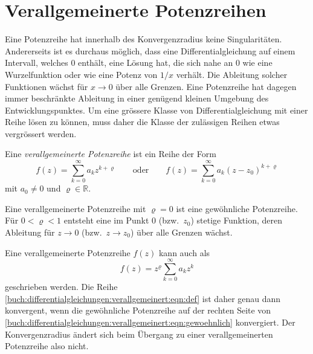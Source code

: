 %
%
%
\section{Verallgemeinerte Potenzreihen}
Eine Potenzreihe hat innerhalb des Konvergenzradius keine Singularitäten.
Andererseits ist es durchaus möglich, dass eine Differentialgleichung
auf einem Intervall, welches $0$ enthält, eine Lösung hat, die sich
nahe an $0$ wie eine Wurzelfunktion oder wie eine Potenz von $1/x$
verhält.
Die Ableitung solcher Funktionen wächst für $x\to 0$ über alle
Grenzen.
Eine Potenzreihe hat dagegen immer beschränkte Ableitung in einer 
genügend kleinen Umgebung des Entwicklungspunktes.
Um eine grössere Klasse von Differentialgleichung mit einer Reihe
lösen zu können, muss daher die Klasse der zulässigen Reihen etwas
vergrössert werden.

\begin{definition}
\label{buch:differentialgleichungen:verallgemeinert:def}
Eine \emph{verallgemeinerte Potenzreihe} ist ein Reihe der Form
%
\begin{equation}
f(z)
=
\sum_{k=0}^\infty
a_k z^{k+\varrho}
\qquad\text{oder}\qquad
f(z)
=
\sum_{k=0}^\infty
a_k (z-z_0)^{k+\varrho}
\label{buch:differentialgleichungen:verallgemeinert:eqn:def}
\end{equation}
mit $a_0\ne 0$ und $\varrho\in\mathbb{R}$.
\end{definition}

Eine verallgemeinerte Potenzreihe mit $\varrho=0$ ist eine gewöhnliche
Potenzreihe.
Für $0<\varrho<1$ entsteht eine im Punkt $0$ (bzw.~$z_0$)
stetige Funktion, deren Ableitung für $z\to 0$ (bzw.~$z\to z_0$)
über alle Grenzen wächst.


Eine verallgemeinerte Potenzreihe $f(z)$ kann auch als
\begin{equation}
f(z)
=
z^{\varrho}
\sum_{k=0}^\infty
a_k z^k
\label{buch:differentialgleichungen:verallgemeinert:eqn:gewoehnlich}
\end{equation}
geschrieben werden.
Die Reihe 
\eqref{buch:differentialgleichungen:verallgemeinert:eqn:def}
ist daher genau dann konvergent, wenn die gewöhnliche Potenzreihe
auf der rechten Seite von
\eqref{buch:differentialgleichungen:verallgemeinert:eqn:gewoehnlich}
konvergiert.
Der Konvergenzradius ändert sich beim Übergang zu einer verallgemeinerten
Potenzreihe also nicht.

